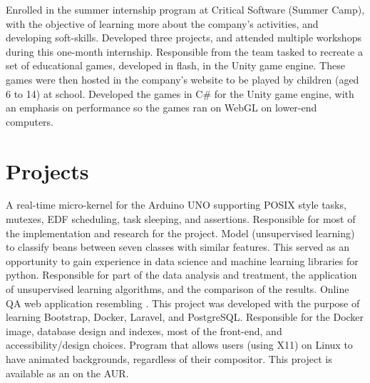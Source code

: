 \documentclass[letterpaper]{twentysecondcv} %
\begin{document}
\begin{twenty}
    {Enrolled in the summer internship program at Critical Software (Summer Camp), with
    the objective of learning more about the company's activities, and developing
    soft-skills. Developed three projects, and attended multiple workshops during
    this one-month internship.}
    {Responsible from the team tasked to recreate a set of educational games, developed
    in flash, in the Unity game engine. These games were then hosted in the company's
    website to be played by children (aged 6 to 14) at school. Developed the games
    in C\# for the Unity game engine, with an emphasis on performance so the games
    ran on WebGL on lower-end computers.}
\end{twenty}


\section{Projects}

\begin{twenty}
    {}
    {A real-time micro-kernel for the Arduino UNO supporting POSIX style tasks, mutexes,
    EDF scheduling, task sleeping, and assertions. Responsible for most of the implementation
    and research for the project.}
    {}
    {Model (unsupervised learning) to classify beans between seven classes with similar
    features. This served as an opportunity to gain experience in data science and machine
    learning libraries for python. Responsible for part of the data analysis and treatment,
    the application of unsupervised learning algorithms, and the comparison of the results.}
    {}
    {Online QA web application resembling .
    This project was developed with the purpose of learning Bootstrap, Docker, Laravel,
    and PostgreSQL. Responsible for the Docker image, database design and indexes,
    most of the front-end, and accessibility/design choices.}
    {}
    {Program that allows users (using X11) on Linux to have animated backgrounds,
    regardless of their compositor. This project is available as an
    on the AUR.}
\end{twenty}
\end{document}
